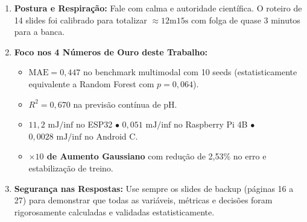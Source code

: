 \documentclass[11pt,a4paper]{article}
\begin{document}
\vspace{0.5cm}
\begin{tcolorbox}[colback=CBALightPurple,colframe=CBAPurple,title=\textbf{Checklist Final Antes de Subir ao Púlpito},boxrule=1pt]
\begin{enumerate}[leftmargin=1.5em,itemsep=3pt]
    \item \textbf{Postura e Respiração:} Fale com calma e autoridade científica. O roteiro de 14 slides foi calibrado para totalizar $\approx 12\text{m}15\text{s}$ com folga de quase 3 minutos para a banca.
    \item \textbf{Foco nos 4 Números de Ouro deste Trabalho:}
    \begin{itemize}
        \item \textbf{$\text{MAE} = 0{,}447$} no benchmark multimodal com 10 seeds (estatisticamente equivalente a Random Forest com $p=0{,}064$).
        \item \textbf{$R^2 = 0{,}670$} na previsão contínua de pH.
        \item \textbf{$11{,}2\text{ mJ/inf}$} no ESP32 $\bullet$ \textbf{$0{,}051\text{ mJ/inf}$} no Raspberry Pi 4B $\bullet$ \textbf{$0{,}0028\text{ mJ/inf}$} no Android C.
        \item \textbf{$\times 10$ de Aumento Gaussiano} com redução de 2,53\% no erro e estabilização de treino.
    \end{itemize}
    \item \textbf{Segurança nas Respostas:} Use sempre os slides de backup (páginas 16 a 27) para demonstrar que todas as variáveis, métricas e decisões foram rigorosamente calculadas e validadas estatisticamente.
\end{enumerate}
\end{tcolorbox}
\end{document}
